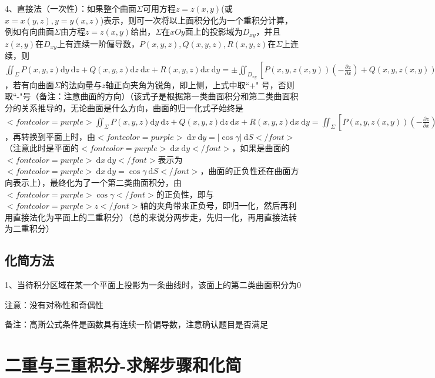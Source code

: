 4、直接法（一次性）：如果整个曲面$ \Sigma $可用方程$ z=z(x, y) $(或$ x=x(y, z), y=y(x, z) $)表示，则可一次将以上面积分化为一个重积分计算，例如有向曲面$ \Sigma $由方程$ z=z(x, y) $给出，$ \Sigma $在$ x O y $面上的投影域为$ D_{x y} $，并且$ z(x, y) $在$ D_{x y} $上有连续一阶偏导数，$ P(x, y, z), Q(x, y, z), R(x, y, z) $在$ \Sigma $上连续，则$ \iint_{\Sigma} P(x, y, z) \mathrm{d} y \mathrm{~d} z+Q(x, y, z) \mathrm{d} z \mathrm{~d} x+R(x, y, z) \mathrm{d} x \mathrm{~d} y = \pm \iint_{D_{x y}}[P(x, y, z(x, y))\left(-\frac{\partial z}{\partial x}\right)+Q(x, y, z(x, y))\left(-\frac{\partial z}{\partial y}\right)+R(x, y, z(x, y))] \mathrm{d} x \mathrm{~d} y $，若有向曲面$ \Sigma $的法向量与$ z $轴正向夹角为锐角，即上侧，上式中取“+" 号，否则取“-"号（备注：注意曲面的方向）（该式子是根据第一类曲面积分和第二类曲面积分的关系推导的，无论曲面是什么方向，曲面的归一化式子始终是$ <font color=purple>\iint_{\Sigma} P(x, y, z) \mathrm{d} y \mathrm{~d} z+Q(x, y, z) \mathrm{d} z \mathrm{~d} x+R(x, y, z) \mathrm{d} x \mathrm{~d} y =  \iint_{\Sigma}[P(x, y, z(x, y))\left(-\frac{\partial z}{\partial x}\right)+Q(x, y, z(x, y))\left(-\frac{\partial z}{\partial y}\right)+R(x, y, z(x, y))] \cos \gamma \ \mathrm{d} S</font> $，再转换到平面上时，由$ <font color=purple>\mathrm{~d} x \mathrm{~d} y = |\cos \gamma | \ \mathrm{d} S</font> $（注意此时是平面的$ <font color=purple>\mathrm{~d} x \mathrm{~d} y</font> $，如果是曲面的$ <font color=purple>\mathrm{~d} x \mathrm{~d} y</font> $表示为$ <font color=purple>\mathrm{~d} x \mathrm{~d} y = \cos \gamma  \ \mathrm{d} S</font> $，曲面的正负性还在曲面方向表示上），最终化为了一个第二类曲面积分，由$ <font color=purple>\cos \gamma</font> $的正负性，即与$ <font color=purple>z</font> $轴的夹角带来正负号，即归一化，然后再利用直接法化为平面上的二重积分）（总的来说分两步走，先归一化，再用直接法转为二重积分）



\subsection{化简方法}

1、当待积分区域在某一个平面上投影为一条曲线时，该面上的第二类曲面积分为0



注意：没有对称性和奇偶性

备注：高斯公式条件是函数具有连续一阶偏导数，注意确认题目是否满足

\section{二重与三重积分-求解步骤和化简}




